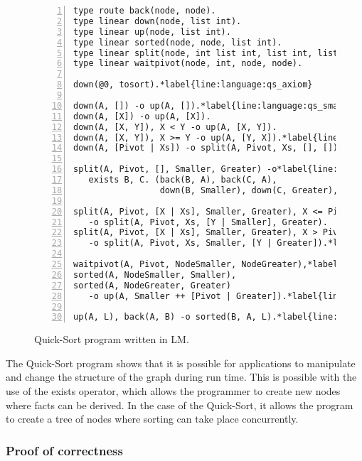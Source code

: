 \begin{figure}[h!]
\begin{Verbatim}[numbers=left,fontsize=\codesize,commandchars=\*\{\}]
type route back(node, node).
type linear down(node, list int).
type linear up(node, list int).
type linear sorted(node, node, list int).
type linear split(node, int list int, list int, list int).
type linear waitpivot(node, int, node, node).

down(@0, tosort).*label{line:language:qs_axiom}

down(A, []) -o up(A, []).*label{line:language:qs_small1}
down(A, [X]) -o up(A, [X]).
down(A, [X, Y]), X < Y -o up(A, [X, Y]).
down(A, [X, Y]), X >= Y -o up(A, [Y, X]).*label{line:language:qs_small2}
down(A, [Pivot | Xs]) -o split(A, Pivot, Xs, [], []).*label{line:language:qs_complex}

split(A, Pivot, [], Smaller, Greater) -o*label{line:language:qs_exists1}
   exists B, C. (back(B, A), back(C, A),
                 down(B, Smaller), down(C, Greater), waitpivot(A, Pivot, B, C)).*label{line:language:qs_exists2}

split(A, Pivot, [X | Xs], Smaller, Greater), X <= Pivot*label{line:language:qs_split1}
   -o split(A, Pivot, Xs, [Y | Smaller], Greater).
split(A, Pivot, [X | Xs], Smaller, Greater), X > Pivot
   -o split(A, Pivot, Xs, Smaller, [Y | Greater]).*label{line:language:qs_split2}
   
waitpivot(A, Pivot, NodeSmaller, NodeGreater),*label{line:language:qs_sorted1}
sorted(A, NodeSmaller, Smaller),
sorted(A, NodeGreater, Greater)
   -o up(A, Smaller ++ [Pivot | Greater]).*label{line:language:qs_sorted2}*label{line:language:qs_up} // Append the lists.

up(A, L), back(A, B) -o sorted(B, A, L).*label{line:language:qs_back}
\end{Verbatim}
  \caption{Quick-Sort program written in LM.}
  \label{language:code:quicksort}
\end{figure}

The Quick-Sort program shows that it is possible for applications to manipulate
and change the structure of the graph during run time. This is possible with the
use of the exists operator, which allows the programmer to create new nodes
where facts can be derived. In the case of the Quick-Sort, it allows the program
to create a tree of nodes where sorting can take place concurrently.

\subsubsection{Proof of correctness}

